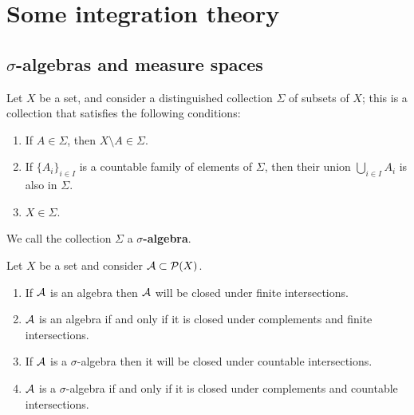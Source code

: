 \section{Some integration theory}
    \subsection{\texorpdfstring{$\sigma$}{}-algebras and measure spaces}
        \begin{definition} \label{def: sigma_algebras}
            Let $X$ be a set, and consider a distinguished collection $\Sigma$ of subsets of $X$; this is a collection that satisfies the following conditions:
                \begin{enumerate}
                    \item If $A \in \Sigma$, then $X \setminus A \in \Sigma$. 
                    \item If $\{A_i\}_{i \in I}$ is a countable family of elements of $\Sigma$, then their union $\bigcup_{i \in I} A_i$ is also in $\Sigma$.
                    \item $X \in \Sigma$.
                \end{enumerate}
            We call the collection $\Sigma$ a \textbf{$\sigma$-algebra}.
        \end{definition}
        \begin{proposition} \label{prop: sigma_algebra_criteria}
            Let $X$ be a set and consider $\mathcal{A} \subset \mathcal{P}(X)$. 
                \begin{enumerate}
                    \item If $\mathcal{A}$ is an algebra then $\mathcal{A}$ will be closed under finite intersections.
                    \item $\mathcal{A}$ is an algebra if and only if it is closed under complements and finite intersections.
                    \item If $\mathcal{A}$ is a $\sigma$-algebra then it will be closed under countable intersections.
                    \item $\mathcal{A}$ is a $\sigma$-algebra if and only if it is closed under complements and countable intersections.
                \end{enumerate}
        \end{proposition}
